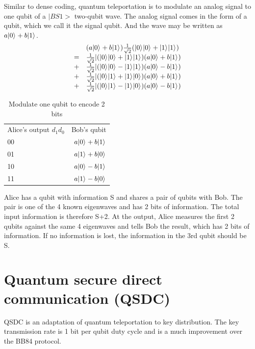 \documentclass[Letter,11pt]{book}
\begin{document}
Similar to dense coding, quantum teleportation is to modulate an analog signal to one qubit of a $|BS1>$ two-qubit wave. The analog signal comes in the form of a qubit, which we call it the signal qubit. And the wave may be written as $a \vert {0} \rangle_{} + b\vert {1} \rangle_{}$.
\begin{equation}\label{}
\begin{array}{rl}
    & (a \vert {0} \rangle_{} + b\vert {1} \rangle_{}) \frac 1 {\sqrt 2}(\vert {0} \rangle_{}\vert {0} \rangle_{}+\vert {1} \rangle_{}\vert {1} \rangle_{}) \\
    = & \frac 1 {\sqrt 2}| (\vert {0} \rangle_{}\vert {0} \rangle_{}+\vert {1} \rangle_{}\vert {1} \rangle_{}) (a \vert {0} \rangle_{} + b\vert {1} \rangle_{}) \\
    +& \frac 1 {\sqrt 2}| (\vert {0} \rangle_{}\vert {0} \rangle_{}-\vert {1} \rangle_{}\vert {1} \rangle_{}) (a \vert {0} \rangle_{} - b\vert {1} \rangle_{}) \\
    +& \frac 1 {\sqrt 2}| (\vert {0} \rangle_{}\vert {1} \rangle_{}+\vert {1} \rangle_{}\vert {0} \rangle_{}) (a \vert {0} \rangle_{} + b\vert {1} \rangle_{}) \\
    +& \frac 1 {\sqrt 2}| (\vert {0} \rangle_{}\vert {1} \rangle_{}-\vert {1} \rangle_{}\vert {0} \rangle_{}) (a \vert {0} \rangle_{} - b\vert {1} \rangle_{})
\end{array}
\end{equation}

\begin{table}[]
\caption{Modulate one qubit to encode 2 bits}
\label{TeleportationTable}
\begin{tabular}{lr}
Alice's output $d_1 d_0$ & Bob's qubit  \\
00 & $a\vert {0} \rangle_{}+b\vert {1} \rangle_{}$ \\
01 & $a\vert {1} \rangle_{}+b\vert {0} \rangle_{}$ \\
10 & $a\vert {0} \rangle_{}-b\vert {1} \rangle_{}$  \\
11 & $a\vert {1} \rangle_{}-b\vert {0} \rangle_{}$ 
\end{tabular}
\end{table}

Alice has a qubit with information S and shares a pair of qubits with Bob. The pair is one of the 4 known eigenwaves and has 2 bits of information. The total input information is therefore S+2. At the output, Alice measures the first 2 qubits against the same 4 eigenwaves and tells Bob the result, which has 2 bits of information. If no information is lost, the information in the 3rd qubit should be S.

\section{Quantum secure direct communication (QSDC)}
QSDC is an adaptation of quantum teleportation to key distribution. The key transmission rate is 1 bit per qubit duty cycle and is a much improvement over the BB84 protocol.
\end{document}
